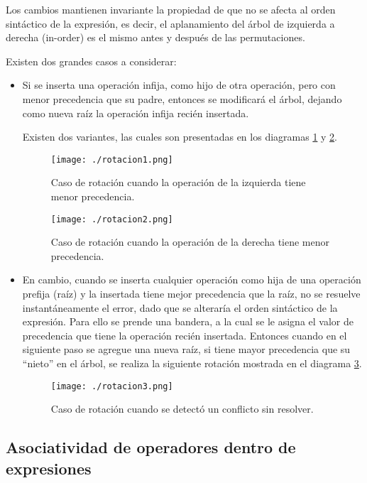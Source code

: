 Los cambios mantienen invariante la propiedad de que no se afecta al orden sintáctico de la expresión, es decir, el aplanamiento del árbol de izquierda a derecha (in-order) es el mismo antes y después de las permutaciones.

Existen dos grandes casos a considerar:

\begin{itemize}
\item Si se inserta una operación infija, como hijo de otra operación, pero con menor precedencia que su padre, entonces se modificará el árbol, dejando como nueva raíz la operación infija recién insertada. 

Existen dos variantes, las cuales son presentadas en los diagramas \ref{rotacion1} y \ref{rotacion2}.

\begin{figure}[!ht]\centering
\texttt{[image: ./rotacion1.png]}
\caption{\label{rotacion1} Caso de rotación cuando la operación de la izquierda tiene menor precedencia.}
\end{figure}

\begin{figure}[!ht]\centering
\texttt{[image: ./rotacion2.png]}
\caption{\label{rotacion2} Caso de rotación cuando la operación de la derecha tiene menor precedencia.}
\end{figure}

\item En cambio, cuando se inserta cualquier operación como hija de una operación prefija (raíz) y la insertada tiene mejor precedencia que la raíz, no se resuelve instantáneamente el error, dado que se alteraría el orden sintáctico de la expresión. Para ello se prende una bandera, a la cual se le asigna el valor de precedencia que tiene la operación recién insertada. Entonces cuando en el siguiente paso se agregue una nueva raíz, si tiene mayor precedencia que su ``nieto'' en el árbol, se realiza la siguiente rotación mostrada en el diagrama \ref{rotacion3}.

\begin{figure}[!ht]\centering
\texttt{[image: ./rotacion3.png]}
\caption{\label{rotacion3} Caso de rotación cuando se detectó un conflicto sin resolver.}
\end{figure}
\end{itemize}

\subsection{Asociatividad de operadores dentro de expresiones}

